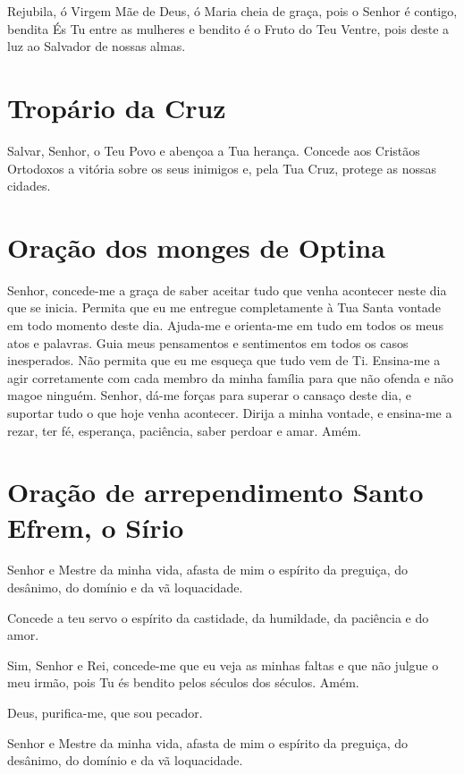 \documentclass{subfiles}
\begin{document}
Rejubila, ó Virgem Mãe de Deus, ó Maria cheia de graça, pois o Senhor é contigo,
bendita És Tu entre as mulheres e bendito é o Fruto do Teu Ventre, pois deste a
luz ao Salvador de nossas almas.

\section*{Tropário da Cruz}

Salvar, Senhor, o Teu Povo e abençoa a Tua herança. Concede aos Cristãos
Ortodoxos a vitória sobre os seus inimigos e, pela Tua Cruz, protege as nossas
cidades.

\section*{Oração dos monges de Optina}

Senhor, concede-me a graça de saber aceitar tudo que venha acontecer neste dia
que se inicia. Permita que eu me entregue completamente à Tua Santa vontade em
todo momento deste dia. Ajuda-me e orienta-me em tudo em todos os meus atos e
palavras. Guia meus pensamentos e sentimentos em todos os casos inesperados. Não
permita que eu me esqueça que tudo vem de Ti. Ensina-me a agir corretamente com
cada membro da minha família para que não ofenda e não magoe ninguém. Senhor,
dá-me forças para superar o cansaço deste dia, e suportar tudo o que hoje venha
acontecer. Dirija a minha vontade, e ensina-me a rezar, ter fé, esperança,
paciência, saber perdoar e amar. Amém.


\section*{Oração de arrependimento Santo Efrem, o Sírio}

Senhor e Mestre da minha vida, afasta de mim o espírito da preguiça, do desânimo,
do domínio e da vã loquacidade.

Concede a teu servo o espírito da castidade, da humildade, da paciência e do amor.

Sim, Senhor e Rei, concede-me que eu veja as minhas faltas e que não julgue o meu
irmão, pois Tu és bendito pelos séculos dos séculos. Amém.

Deus, purifica-me, que sou pecador. 

Senhor e Mestre da minha vida, afasta de mim o espírito da preguiça, do desânimo,
do domínio e da vã loquacidade.
\end{document}
